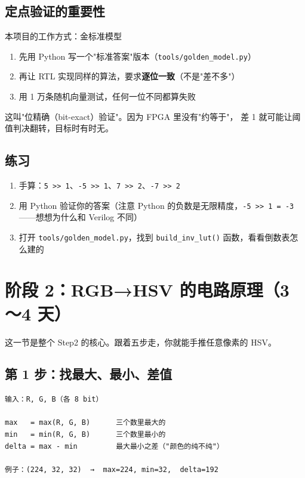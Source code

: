 \documentclass[11pt]{ctexart}
\newcommand{\code}[1]{\texttt{#1}}
\begin{document}
\subsection{定点验证的重要性}

\begin{okbox}{本项目的工作方式：金标准模型}
\begin{enumerate}
  \item 先用 Python 写一个"标准答案"版本（\code{tools/golden\_model.py}）
  \item 再让 RTL 实现同样的算法，要求\textbf{逐位一致}（不是"差不多"）
  \item 用 1 万条随机向量测试，任何一位不同都算失败
\end{enumerate}
这叫"位精确（bit-exact）验证"。因为 FPGA 里没有"约等于"，
差 1 就可能让阈值判决翻转，目标时有时无。
\end{okbox}

\subsection{练习}

\begin{enumerate}
  \item 手算：\code{5 >> 1}、\code{-5 >> 1}、\code{7 >> 2}、\code{-7 >> 2}
  \item 用 Python 验证你的答案（注意 Python 的负数是无限精度，\code{-5 >> 1 = -3}——想想为什么和 Verilog 不同）
  \item 打开 \code{tools/golden\_model.py}，找到 \code{build\_inv\_lut()} 函数，看看倒数表怎么建的
\end{enumerate}

\section{阶段 2：RGB→HSV 的电路原理（3～4 天）}

这一节是整个 Step2 的核心。跟着五步走，你就能手推任意像素的 HSV。

\subsection{第 1 步：找最大、最小、差值}

\begin{Verbatim}[frame=single,fontsize=\small]
输入：R, G, B（各 8 bit）

max   = max(R, G, B)      三个数里最大的
min   = min(R, G, B)      三个数里最小的
delta = max - min         最大最小之差（"颜色的纯不纯"）

例子：(224, 32, 32)  →  max=224, min=32,  delta=192
\end{Verbatim}
\end{document}
